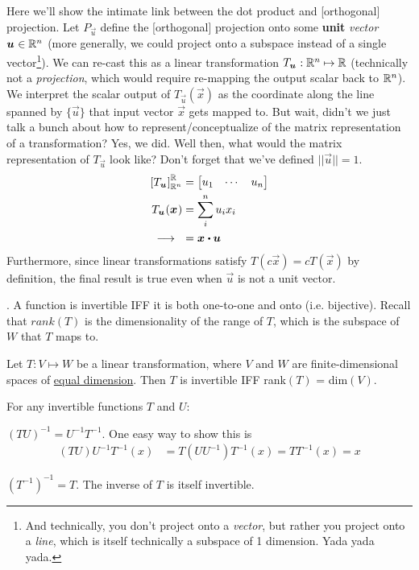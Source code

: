 \documentclass[11pt]{article}
\begin{document}
Here we'll show the intimate link between the dot product and [orthogonal] projection. Let $P_{\vec u}$ define the [orthogonal] projection onto some \textbf{unit} \textit{vector} $\bm{u}_{} \in \mathbb{R}^n$ (more generally, we could project onto a subspace instead of a single vector\footnote{And technically, you don't project onto a \textit{vector}, but rather you project onto a \textit{line}, which is itself technically a subspace of 1 dimension. Yada yada yada.}). We can re-cast this as a linear transformation $T_{\bm{u}_{}} : \mathbb{R}^n \mapsto \mathbb{R}$ (technically not a \textit{projection}, which would require re-mapping the output scalar back to $\mathbb{R}^n$). We interpret the scalar output of $T_{\vec u}(\vec x)$ as the coordinate along the line spanned by $\{ \vec u \}$ that input vector $\vec x$ gets mapped to. But wait, didn't we just talk a bunch about how to represent/conceptualize of the matrix representation of a transformation? Yes, we did. Well then, what would the matrix representation of $T_{\vec u}$ look like? Don't forget that we've defined $|| \vec u || = 1$.
\begin{align}
	\left[  T_{\vec u}  \right]_{\R^n}^{\R}
		&= \begin{bmatrix}
			u_1 & \cdots & u_n 
		\end{bmatrix} \\
	T_{\vec u}(\vec x) 
		&= \sum_i^n u_i x_i \\
	\longrightarrow ~~	&= \vec x \dotp \vec u
\end{align}
Furthermore, since linear transformations satisfy $T(c \vec x) = c  T(\vec x)$ by definition, the final result is true even when $\vec u$ is not a unit vector. 



\myspace
{}. A function is invertible IFF it is both one-to-one and onto (i.e. bijective). Recall that $rank(T)$ is the dimensionality of the range of $T$, which is the subspace of $W$ that $T$ maps to. 
\begin{definition}
	Let $T: V \mapsto W$ be a linear transformation, where $V$ and $W$ are finite-dimensional spaces of \underline{equal dimension}. Then $T$ is invertible IFF rank$(T)$ = dim$(V)$. 
\end{definition}
For any invertible functions $T$ and $U$:
\begin{compactitem}
	\item $(TU)^{-1} = U^{-1} T^{-1}$. One easy way to show this is
	\begin{align}
		(TU)U^{-1}T^{-1}(x)
			&= T(UU^{-1})T^{-1}(x)
			= TT^{-1}(x)
			= x
	\end{align}
	
	\item $(T^{-1})^{-1} = T$. The inverse of $T$ is itself invertible. 
\end{compactitem}
\vspace{1em}
\end{document}
